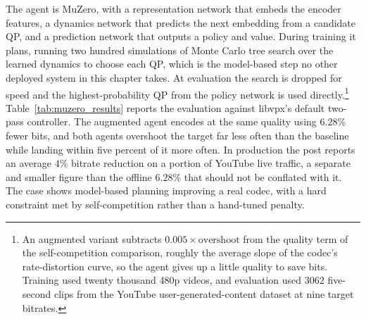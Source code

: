 The agent is MuZero, with a representation network that embeds the encoder features, a dynamics network that predicts the next embedding from a candidate QP, and a prediction network that outputs a policy and value. During training it plans, running two hundred simulations of Monte Carlo tree search over the learned dynamics to choose each QP, which is the model-based step no other deployed system in this chapter takes. At evaluation the search is dropped for speed and the highest-probability QP from the policy network is used directly.\footnote{An augmented variant subtracts $0.005\times\text{overshoot}$ from the quality term of the self-competition comparison, roughly the average slope of the codec's rate-distortion curve, so the agent gives up a little quality to save bits. Training used twenty thousand 480p videos, and evaluation used 3062 five-second clips from the YouTube user-generated-content dataset at nine target bitrates.} Table~\ref{tab:muzero_results} reports the evaluation against libvpx's default two-pass controller. The augmented agent encodes at the same quality using $6.28\%$ fewer bits, and both agents overshoot the target far less often than the baseline while landing within five percent of it more often. In production the post \citep{DeepMind2022MuZeroRCPost} reports an average $4\%$ bitrate reduction on a portion of YouTube live traffic, a separate and smaller figure than the offline $6.28\%$ that should not be conflated with it. The case shows model-based planning improving a real codec, with a hard constraint met by self-competition rather than a hand-tuned penalty.

